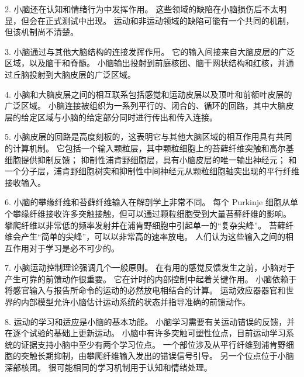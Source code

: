 2. 小脑还在认知和情绪行为中发挥作用。 这些领域的缺陷在小脑损伤后不太明显，但会在正式测试中出现。 运动和非运动领域的缺陷可能有一个共同的机制，但该机制尚不清楚。

3. 小脑通过与其他大脑结构的连接发挥作用。 它的输入间接来自大脑皮层的广泛区域，以及脑干和脊髓。 小脑输出投射到前庭核团、脑干网状结构和红核，并通过丘脑投射到大脑皮层的广泛区域。

4. 小脑和大脑皮层之间的相互联系包括感觉和运动皮层以及顶叶和前额叶皮层的广泛区域。 小脑连接被组织为一系列平行的、闭合的、循环的回路，其中大脑皮层的给定区域与小脑的给定部分同时进行传出和传入连接。

5. 小脑皮层的回路是高度刻板的，这表明它与其他大脑区域的相互作用具有共同的计算机制。 它包括一个输入颗粒层，其中颗粒细胞上的苔藓纤维突触和高尔基细胞提供抑制反馈； 抑制性浦肯野细胞层，具有小脑皮层的唯一输出神经元； 和一个分子层，浦肯野细胞树突和抑制性中间神经元从颗粒细胞轴突出现的平行纤维接收输入。

6. 小脑的攀缘纤维和苔藓纤维输入在解剖学上非常不同。 每个 Purkinje 细胞从单个攀缘纤维接收许多突触接触，但可以通过颗粒细胞受到大量苔藓纤维的影响。 攀爬纤维以非常低的频率发射并在浦肯野细胞中引起单一的“复杂尖峰”。 苔藓纤维会产生“简单的尖峰”，可以以非常高的速率放电。 人们认为这些输入之间的相互作用对于学习是必不可少的。

7. 小脑运动控制理论强调几个一般原则。 在有用的感觉反馈发生之前，小脑对于产生可靠的前馈动作很重要。 它在计时的内部控制中起着关键作用。 小脑依赖于将感官输入与报告所命令的运动的必然放电相结合的计算。 运动效应器器官和世界的内部模型允许小脑估计运动系统的状态并指导准确的前馈动作。

8. 运动的学习和适应是小脑的基本功能。 小脑学习需要有关运动错误的反馈，并在逐个试验的基础上更新运动。 小脑中有许多突触可塑性位点，目前运动学习系统的证据支持小脑中至少有两个学习位点。 一个部位涉及从平行纤维到浦肯野细胞的突触长期抑制，由攀爬纤维输入发出的错误信号引导。 另一个位点位于小脑深部核团。 很可能相同的学习机制用于认知和情绪处理。


